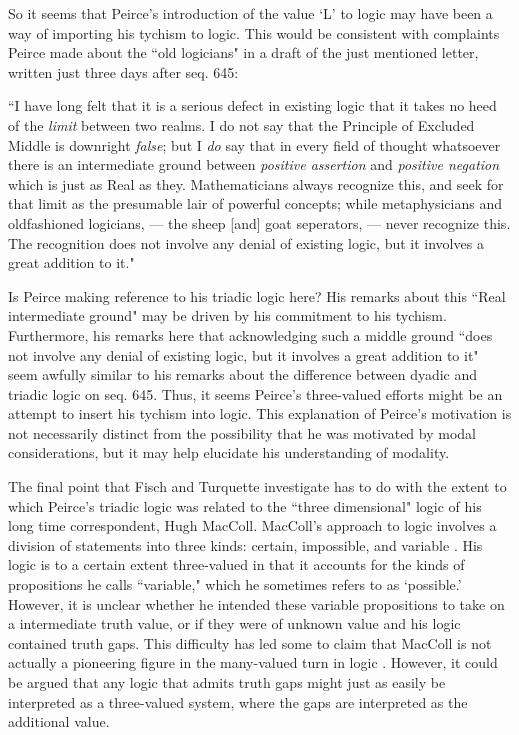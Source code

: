 \documentclass[12pt]{article}
\begin{document}
So it seems that Peirce's introduction of the value `L' to logic may have been a way of importing his tychism to logic. This would be consistent with complaints Peirce made about the ``old logicians" in a draft of the just mentioned letter, written just three days after seq. 645:
\begin{singlespace} 
\noindent``I have long felt that it is a serious defect in existing logic that it takes no heed of the \textit{limit} between two realms. I do not say that the Principle of Excluded Middle is downright \textit{false}; but I \textit{do} say that in every field of thought whatsoever there is an intermediate ground between \textit{positive assertion} and \textit{positive negation} which is just as Real as they. Mathematicians always recognize this, and seek for that limit as the presumable lair of powerful concepts; while metaphysicians and oldfashioned logicians, --- the sheep [and] goat seperators, --- never recognize this. The recognition does not involve any denial of existing logic, but it involves a great addition to it."
\end{singlespace}
\noindent Is Peirce making reference to his triadic logic here? His remarks about this ``Real intermediate ground" may be driven by his commitment to his tychism. Furthermore, his remarks here that acknowledging such a middle ground ``does not involve any denial of existing logic, but it involves a great addition to it" seem awfully similar to his remarks about the difference between dyadic and triadic logic on seq. 645. Thus, it seems Peirce's three-valued efforts might be an attempt to insert his tychism into logic. This explanation of Peirce's motivation is not necessarily distinct from the possibility that he was motivated by modal considerations, but it may help elucidate his understanding of modality.

The final point that Fisch and Turquette investigate has to do with the extent to which Peirce's triadic logic was related to the ``three dimensional" logic of his long time correspondent, Hugh MacColl. MacColl's approach to logic involves a division of statements into three kinds: certain, impossible, and variable \citep{maccoll1906symbolic}. His logic is to a certain extent three-valued in that it accounts for the kinds of propositions he calls ``variable," which he sometimes refers to as `possible.' However, it is unclear whether he intended these variable propositions to take on a intermediate truth value, or if they were of unknown value and his logic contained truth gaps. This difficulty has led some to claim that MacColl is not actually a pioneering figure in the many-valued turn in logic \citep{conjunction1998peter}. However, it could be argued that any logic that admits truth gaps might just as easily be interpreted as a three-valued system, where the gaps are interpreted as the additional value.
\end{document}
